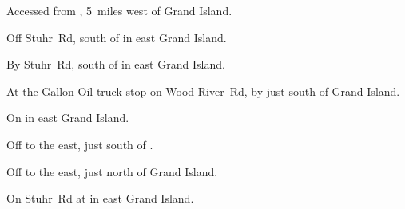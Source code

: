 
\begin{LocationList}

Accessed from , 5~miles west of Grand Island.

Off Stuhr~Rd, south of  in east Grand Island.

By Stuhr~Rd, south of  in east Grand Island.

At the Gallon Oil truck stop on Wood River~Rd, by  just south of Grand Island.

\Location{\GarageHQ \Garage}
On  in east Grand Island.

Off  to the east, just south of .

Off  to the east, just north of Grand Island.

On Stuhr~Rd at  in east Grand Island.

\end{LocationList}
